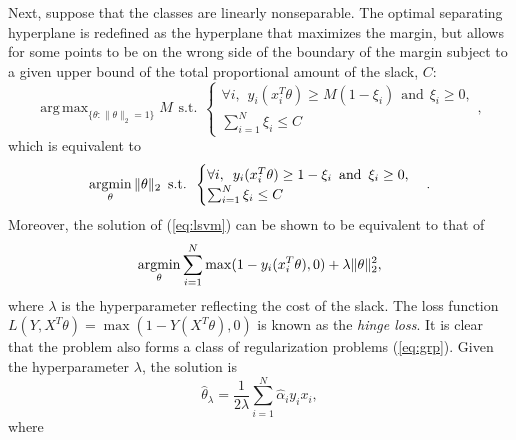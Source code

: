 \documentclass[12pt]{article}
\DeclareMathOperator*{\argmax}{arg\,max}
\newcommand{\argmin}{\mathop{\rm argmin}\limits}
\begin{document}
Next, suppose that the classes are linearly nonseparable. The optimal separating hyperplane is redefined as the hyperplane that maximizes the margin, but allows for some points to be on the wrong side of the boundary of the margin subject to a given upper bound of the total proportional amount of the slack, $C$:
\begin{equation*}
\argmax_{\{\theta: \|\theta\|_2 = 1\}} M \hspace{5pt} \text{s.t.} \hspace{5pt}
\begin{cases}
\forall i, \hspace{5pt} y_i (x_i^T \theta) \geq M (1 - \xi_i) \hspace{5pt} \text{and} \hspace{5pt} \xi_i \geq 0,\\
\sum_{i=1}^N \xi_i \leq C
\end{cases},
\end{equation*}
which is equivalent to
\begin{equation}
\label{eq:lsvm}
\argmin_{\theta} \|\theta\|_2 \hspace{5pt} \text{s.t.} \hspace{5pt}
\begin{cases}
\forall i, \hspace{5pt} y_i (x_i^T \theta) \geq 1 - \xi_i \hspace{5pt} \text{and} \hspace{5pt} \xi_i \geq 0,\\
\sum_{i=1}^N \xi_i \leq C
\end{cases}.
\end{equation}
Moreover, the solution of (\ref{eq:lsvm}) can be shown to be equivalent to that of 
\begin{equation*}
\argmin_{\theta} \sum_{i=1}^N \max (1 - y_i (x_i^T \theta), 0) + \lambda \|\theta\|_2^2,
\end{equation*}
where $\lambda$ is the hyperparameter reflecting the cost of the slack. The loss function $L(Y,X^T \theta) = \max (1 - Y (X^T \theta), 0)$ is known as the {\it hinge loss}. It is clear that the problem also forms a class of regularization problems (\ref{eq:grp}). Given the hyperparameter $\lambda$, the solution is
\begin{equation*}
\hat{\theta}_{\lambda} = \frac{1}{2 \lambda} \sum_{i=1}^N \hat{\alpha}_i y_i x_i,
\end{equation*}
where
\end{document}
